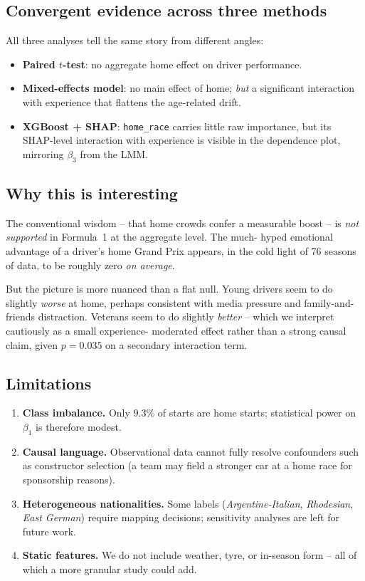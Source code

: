 \documentclass[11pt,a4paper]{article}
\begin{document}
\subsection{Convergent evidence across three methods}
All three analyses tell the same story from different angles:
\begin{itemize}[leftmargin=*]
    \item \textbf{Paired $t$-test}: no aggregate home effect on driver
    performance.
    \item \textbf{Mixed-effects model}: no main effect of home; \emph{but} a
    significant interaction with experience that flattens the
    age-related drift.
    \item \textbf{XGBoost + SHAP}: \texttt{home\_race} carries little raw
    importance, but its SHAP-level interaction with experience is visible
    in the dependence plot, mirroring $\beta_3$ from the LMM.
\end{itemize}

\subsection{Why this is interesting}
The conventional wisdom -- that home crowds confer a measurable boost --
is \emph{not supported} in Formula~1 at the aggregate level. The much-
hyped emotional advantage of a driver's home Grand Prix appears, in the
cold light of 76 seasons of data, to be roughly zero \emph{on average}.

But the picture is more nuanced than a flat null. Young drivers seem to
do slightly \emph{worse} at home, perhaps consistent with media pressure
and family-and-friends distraction. Veterans seem to do slightly
\emph{better} -- which we interpret cautiously as a small experience-
moderated effect rather than a strong causal claim, given $p=0.035$ on a
secondary interaction term.

\subsection{Limitations}
\begin{enumerate}[leftmargin=*]
    \item \textbf{Class imbalance.} Only $9.3\%$ of starts are home starts;
    statistical power on $\beta_1$ is therefore modest.
    \item \textbf{Causal language.} Observational data cannot fully resolve
    confounders such as constructor selection (a team may field a stronger
    car at a home race for sponsorship reasons).
    \item \textbf{Heterogeneous nationalities.} Some labels
    (\textit{Argentine-Italian}, \textit{Rhodesian}, \textit{East German})
    require mapping decisions; sensitivity analyses are left for future
    work.
    \item \textbf{Static features.} We do not include weather, tyre, or
    in-season form -- all of which a more granular study could add.
\end{enumerate}
\end{document}
